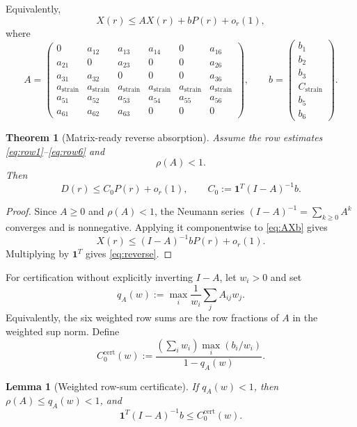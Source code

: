 \documentclass[11pt]{article}
\newtheorem{theorem}{Theorem}
\newtheorem{lemma}{Lemma}
\begin{document}
Equivalently,
\begin{equation}
\label{eq:AXb}
X(r)\le A X(r)+bP(r)+o_r(1),
\end{equation}
where
\[
A=
\begin{pmatrix}
0&a_{12}&a_{13}&a_{14}&0&a_{16}\\
a_{21}&0&a_{23}&0&0&a_{26}\\
a_{31}&a_{32}&0&0&0&a_{36}\\
a_{\mathrm{strain}}&a_{\mathrm{strain}}&a_{\mathrm{strain}}
&a_{\mathrm{strain}}&a_{\mathrm{strain}}&a_{\mathrm{strain}}\\
a_{51}&a_{52}&a_{53}&a_{54}&a_{55}&a_{56}\\
a_{61}&a_{62}&a_{63}&0&0&0
\end{pmatrix},
\qquad
b=
\begin{pmatrix}
b_1\\ b_2\\ b_3\\ C_{\mathrm{strain}}\\ b_5\\ b_6
\end{pmatrix}.
\]

\begin{theorem}[Matrix-ready reverse absorption]
\label{thm:K5}
Assume the row estimates \eqref{eq:row1}--\eqref{eq:row6} and
\[
\rho(A)<1.
\]
Then
\begin{equation}
\label{eq:reverse}
D(r)\le C_0P(r)+o_r(1),
\qquad
C_0:=\mathbf 1^T(I-A)^{-1}b.
\end{equation}
\end{theorem}

\begin{proof}
Since \(A\ge0\) and \(\rho(A)<1\), the Neumann series
\((I-A)^{-1}=\sum_{k\ge0}A^k\) converges and is nonnegative.  Applying it
componentwise to \eqref{eq:AXb} gives
\[
X(r)\le (I-A)^{-1}bP(r)+o_r(1).
\]
Multiplying by \(\mathbf 1^T\) gives \eqref{eq:reverse}.
\end{proof}

For certification without explicitly inverting \(I-A\), let \(w_i>0\) and set
\[
q_A(w):=\max_i\frac{1}{w_i}\sum_j A_{ij}w_j.
\]
Equivalently, the six weighted row sums are the row fractions of \(A\) in the
weighted sup norm.  Define
\begin{equation}
\label{eq:C0-cert}
C_0^{\mathrm{cert}}(w)
:=
\frac{
(\sum_iw_i)\max_i(b_i/w_i)
}{
1-q_A(w)
}.
\end{equation}

\begin{lemma}[Weighted row-sum certificate]
\label{lem:weighted-certificate}
If \(q_A(w)<1\), then \(\rho(A)\le q_A(w)<1\), and
\[
\mathbf 1^T(I-A)^{-1}b\le C_0^{\mathrm{cert}}(w).
\]
\end{lemma}
\end{document}
